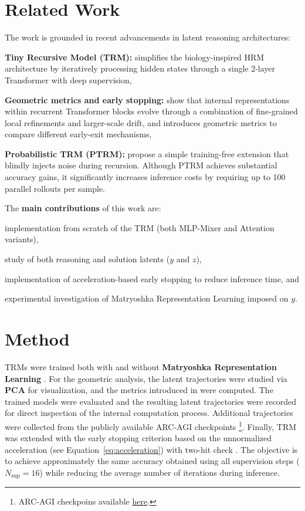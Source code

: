 \documentclass{article}
\begin{document}
\section{Related Work}
The work is grounded in recent advancements in latent reasoning architectures: \begin{enumerate*}[label=(\roman*)]
\item \textbf{Tiny Recursive Model (TRM):}
\citet{trm} simplifies the biology-inspired HRM architecture \cite{hrm} by iteratively processing hidden states through a single 2-layer Transformer with deep supervision,
\item \textbf{Geometric metrics and early stopping:}
\citet{latent-dynamics} show that internal representations within recurrent Transformer blocks evolve through a combination of fine-grained local refinements and larger-scale drift, and introduces geometric metrics to compare different early-exit mechanisms,
\item \textbf{Probabilistic TRM (PTRM):}
\citet{ptrm} propose a simple training-free extension that blindly injects noise during recursion. Although PTRM achieves substantial accuracy gains, it significantly increases inference costs by requiring up to 100 parallel rollouts per sample.
\end{enumerate*}
The \textbf{main contributions} of this work are: \begin{enumerate*}[label=(\roman*)]
\item implementation from scratch of the TRM (both MLP-Mixer and Attention variants),
\item study of both reasoning and solution latents ($y$ and $z$),
\item implementation of acceleration-based early stopping to reduce inference time, and
\item experimental investigation of Matryoshka Representation Learning imposed on $y$.
\end{enumerate*}


\section{Method}
TRMs were trained both with and without \textbf{Matryoshka Representation Learning} \cite{mrl}.
For the geometric analysis, the latent trajectories were studied via \textbf{PCA} for visualization, and the metrics introduced in \cite{latent-dynamics} were computed.
The trained models were evaluated and the resulting latent trajectories were recorded for direct inspection of the internal computation process. Additional trajectories were collected from the publicly available ARC-AGI checkpoints \footnote{ARC-AGI checkpoins available \href{https://huggingface.co/arcprize/trm_arc_prize_verification}{here}.}.
Finally, TRM was extended with the early stopping criterion based on the unnormalized acceleration (see Equation~\ref{eq:acceleration}) with two-hit check \cite{latent-dynamics}.
The objective is to achieve approximately the same accuracy obtained using all supervision steps ($N_{\text{sup}} = 16$) while reducing the average number of iterations during inference.
\end{document}
